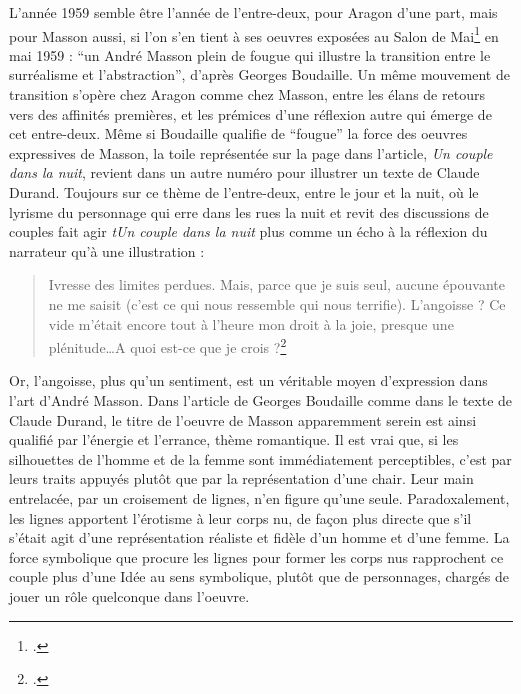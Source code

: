 L’année 1959 semble être l’année de l’entre-deux, pour Aragon d’une part, mais pour Masson aussi, si l’on s’en tient à ses oeuvres exposées au Salon de Mai\footcite{salondemai} en mai 1959 : \enquote{un André Masson plein de fougue qui illustre la transition entre le surréalisme et l’abstraction}, d’après Georges Boudaille. Un même mouvement de transition s’opère chez Aragon comme chez Masson, entre les élans de retours vers des affinités premières, et les prémices d’une réflexion autre qui émerge de cet entre-deux. Même si Boudaille qualifie de \enquote{fougue} la force des oeuvres expressives de Masson, la toile représentée sur la page dans l’article, \emph{Un couple dans la nuit}, revient dans un autre numéro pour illustrer un texte de Claude Durand. Toujours sur ce thème de l’entre-deux, entre le jour et la nuit, où le lyrisme du personnage qui erre dans les rues la nuit et revit des discussions de couples fait agir \emph{tUn couple dans la nuit} plus comme un écho à la réflexion du narrateur qu’à une illustration : 


\begin{quote}
Ivresse des limites perdues. Mais, parce que je suis seul, aucune épouvante ne me saisit (c’est ce qui nous ressemble qui nous terrifie). L’angoisse ? Ce vide m’était encore tout à l’heure mon droit à la joie, presque une plénitude…A quoi est-ce que je crois ?\footcite{} 	
\end{quote}

 Or, l’angoisse, plus qu’un sentiment, est un véritable moyen d’expression dans l’art d’André Masson. Dans l’article de Georges Boudaille comme dans le texte de Claude Durand, le titre de l’oeuvre de Masson apparemment serein est ainsi qualifié par l’énergie et l’errance, thème romantique. Il est vrai que, si les silhouettes de l’homme et de la femme sont immédiatement perceptibles, c’est par leurs traits appuyés plutôt que par la représentation d’une chair. Leur main entrelacée, par un croisement de lignes, n’en figure qu’une seule. Paradoxalement, les lignes apportent l’érotisme à leur corps nu, de façon plus directe que s’il s’était agit d’une représentation réaliste et fidèle d’un homme et d’une femme. La force symbolique que procure les lignes pour former les corps nus rapprochent ce couple plus d’une Idée au sens symbolique, plutôt que de personnages, chargés de jouer un rôle quelconque dans l’oeuvre.  


